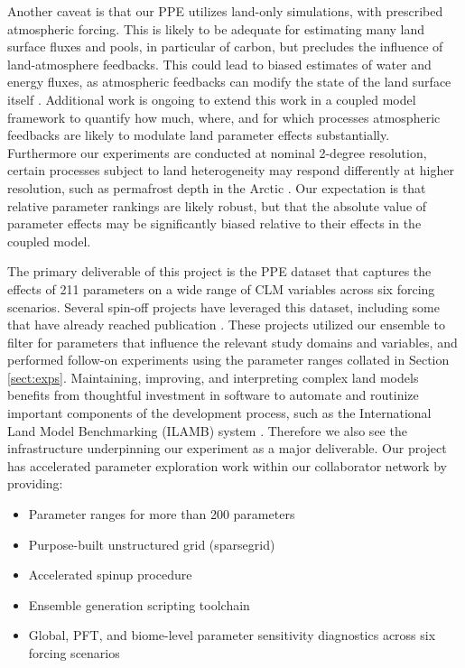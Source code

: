 \documentclass[draft]{agujournal2019}
\begin{document}
Another caveat is that our PPE utilizes land-only simulations, with prescribed atmospheric forcing. This is likely to be adequate for estimating many land surface fluxes and pools, in particular of carbon, but precludes the influence of land-atmosphere feedbacks. This could lead to biased estimates of water and energy fluxes, as atmospheric feedbacks can modify the state of the land surface itself \cite{lague2019}. Additional work is ongoing to extend this work in a coupled model framework to quantify how much, where, and for which processes atmospheric feedbacks are likely to modulate land parameter effects substantially. 
Furthermore our experiments are conducted at nominal 2-degree resolution, certain processes subject to land heterogeneity may respond differently at higher resolution, such as permafrost depth in the Arctic \cite{schickhoff2024}.
Our expectation is that relative parameter rankings are likely robust, but that the absolute value of parameter effects may be significantly biased relative to their effects in the coupled model. 

The primary deliverable of this project is the PPE dataset that captures the effects of 211 parameters on a wide range of CLM variables across six forcing scenarios. Several spin-off projects have leveraged this dataset, including some that have already reached publication \cite{cheng2023,yan2023a,yan2023b}. These projects utilized our ensemble to filter for parameters that influence the relevant study domains and variables, and performed follow-on experiments using the parameter ranges collated in Section \ref{sect:exps}. 
Maintaining, improving, and interpreting complex land models benefits from thoughtful investment in software to automate and routinize important components of the development process, such as the International Land Model Benchmarking (ILAMB) system \cite{collier2018}.
Therefore we also see the infrastructure underpinning our experiment as a major deliverable. Our project has accelerated parameter exploration work within our collaborator network by providing:

\begin{itemize}
\item Parameter ranges for more than 200 parameters
\item Purpose-built unstructured grid (sparsegrid)
\item Accelerated spinup procedure
\item Ensemble generation scripting toolchain
\item Global, PFT, and biome-level parameter sensitivity diagnostics across six forcing scenarios
\end{itemize} 
\end{document}
